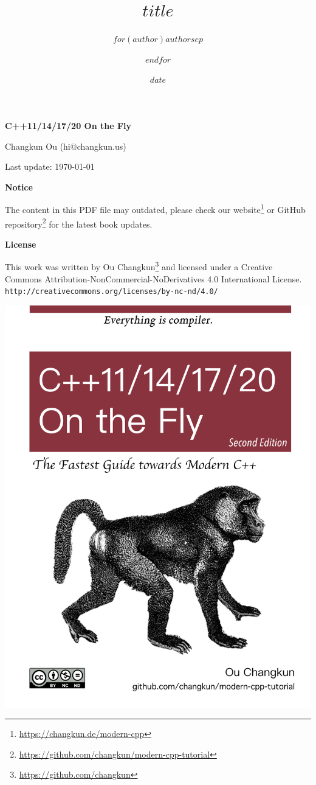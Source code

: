 \documentclass[a4paper, 10pt]{article}
\title{$title$}
\author{$for(author)$$author$$sep$ \and $endfor$}
\date{$date$}
\makeatletter
\def\maxwidth{\ifdim\Gin@nat@width>\linewidth\linewidth
\else\Gin@nat@width\fi}
\let\Oldincludegraphics\includegraphics
\renewcommand{\includegraphics}[1]{\Oldincludegraphics[width=0.7\maxwidth]{#1}}
\renewcommand{\href}[2]{#2\footnote{\url{#1}}}
\makeatother
\begin{document}
\newcommand{\tightlist}{
  \setlength{\itemsep}{0pt}\setlength{\parskip}{0pt}}

\thispagestyle{plain}
\begin{center}

  {\LARGE\textbf{C++11/14/17/20 On the Fly}}

  \vspace{1em}
  {\large Changkun Ou (hi@changkun.us)}

  \vspace{1ex}
  Last update: \today

  \vspace{1ex}
  \textbf{Notice}

  \noindent The content in this PDF file may outdated, please check \href{https://changkun.de/modern-cpp}{our website} or \href{https://github.com/changkun/modern-cpp-tutorial}{GitHub repository} for the latest book updates.

  \vspace{1em}
  \textbf{\large License}

  \noindent This work was written by \href{https://github.com/changkun}{Ou Changkun} and licensed under a Creative Commons Attribution-NonCommercial-NoDerivatives 4.0 International License. \texttt{\small http://creativecommons.org/licenses/by-nc-nd/4.0/}

  \vspace{6em}
  \includegraphics{../../assets/cover-2nd-en}

\end{center}
\end{document}
